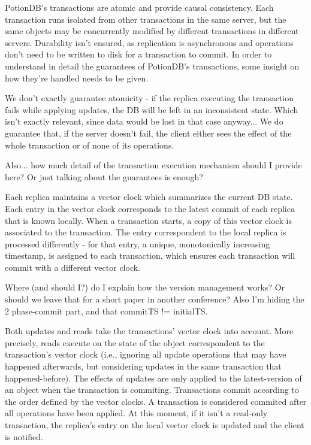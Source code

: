 \documentclass{vldb}
\newcommand{\grumbler}[2]{{\color{red}{\bf #1:} #2}}
\newcommand{\andre}[1]{\grumbler{andre}{#1}}
\begin{document}
PotionDB's transactions are atomic and provide causal consistency.
Each transaction runs isolated from other transactions in the same server, but the same objects may be concurrently modified by different transactions in different servers.
Durability isn't ensured, as replication is asynchronous and operations don't need to be written to disk for a transaction to commit.
In order to understand in detail the guarantees of PotionDB's transactions, some insight on how they're handled needs to be given.

\andre{We don't exactly guarantee atomicity - if the replica executing the transaction fails while applying updates, the DB will be left in an inconsistent state. Which isn't exactly relevant, since data would be lost in that case anyway... We do guarantee that, if the server doesn't fail, the client either sees the effect of the whole transaction or of none of its operations.}

\andre{Also... how much detail of the transaction execution mechanism should I provide here? Or just talking about the guarantees is enough?}

Each replica maintains a vector clock which summarizes the current DB state.
Each entry in the vector clock corresponds to the latest commit of each replica that is known locally.
When a transaction starts, a copy of this vector clock is associated to the transaction.
The entry correspondent to the local replica is processed differently - for that entry, a unique, monotonically increasing timestamp, is assigned to each transaction, which ensures each transaction will commit with a different vector clock.

\andre{Where (and should I?) do I explain how the version management works? Or should we leave that for a short paper in another conference? Also I'm hiding the 2 phase-commit part, and that commitTS != initialTS.}

Both updates and reads take the transactions' vector clock into account.
More precisely, reads execute on the state of the object correspondent to the transaction's vector clock (i.e., ignoring all update operations that may have happened afterwards, but considering updates in the same transaction that happened-before).
The effects of updates are only applied to the latest-version of an object when the transaction is commiting.
Transactions commit according to the order defined by the vector clocks.
A transaction is considered commited after all operations have been applied.
At this moment, if it isn't a read-only transaction, the replica's entry on the local vector clock is updated and the client is notified.
\end{document}
